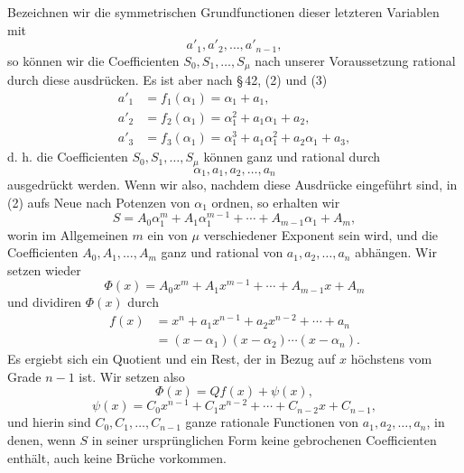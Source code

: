 \documentclass[11pt]{article}
\begin{document}
Bezeichnen wir die symmetrischen Grundfunctionen dieser letzteren Variablen mit
\[
 a'_1,a'_2,\ldots,a'_{n-1},
\]
so können wir die Coefficienten \(S_0,S_1,\ldots,S_\mu\) nach unserer Voraussetzung rational durch diese ausdrücken. Es ist aber nach \S\,42, (2) und (3)
\[
\begin{aligned}
 a'_1&=f_1(\alpha_1)=\alpha_1+a_1,\\
 a'_2&=f_2(\alpha_1)=\alpha_1^2+a_1\alpha_1+a_2,\\
 a'_3&=f_3(\alpha_1)=\alpha_1^3+a_1\alpha_1^2+a_2\alpha_1+a_3,
\end{aligned}
\]
d. h. die Coefficienten \(S_0,S_1,\ldots,S_\mu\) können ganz und rational durch
\[
 \alpha_1,a_1,a_2,\ldots,a_n
\]
ausgedrückt werden. Wenn wir also, nachdem diese Ausdrücke eingeführt sind, in (2) aufs Neue nach Potenzen von \(\alpha_1\) ordnen, so erhalten wir
\begin{equation}
 S=A_0\alpha_1^m+A_1\alpha_1^{m-1}+\cdots+A_{m-1}\alpha_1+A_m,
\tag{3}
\end{equation}
worin im Allgemeinen \(m\) ein von \(\mu\) verschiedener Exponent sein wird, und die Coefficienten \(A_0,A_1,\ldots,A_m\) ganz und rational von \(a_1,a_2,\ldots,a_n\) abhängen. Wir setzen wieder
\begin{equation}
 \Phi(x)=A_0x^m+A_1x^{m-1}+\cdots+A_{m-1}x+A_m
\tag{4}
\end{equation}
und dividiren \(\Phi(x)\) durch
\[
\begin{aligned}
 f(x)&=x^n+a_1x^{n-1}+a_2x^{n-2}+\cdots+a_n\\
     &=(x-\alpha_1)(x-\alpha_2)\cdots(x-\alpha_n).
\end{aligned}
\]
Es ergiebt sich ein Quotient und ein Rest, der in Bezug auf \(x\) höchstens vom Grade \(n-1\) ist. Wir setzen also
\begin{equation}
 \Phi(x)=Qf(x)+\psi(x),
\tag{5}
\end{equation}
\begin{equation}
 \psi(x)=C_0x^{n-1}+C_1x^{n-2}+\cdots+C_{n-2}x+C_{n-1},
\tag{6}
\end{equation}
und hierin sind \(C_0,C_1,\ldots,C_{n-1}\) ganze rationale Functionen von \(a_1,a_2,\ldots,a_n\), in denen, wenn \(S\) in seiner ursprünglichen Form keine gebrochenen Coefficienten enthält, auch keine Brüche vorkommen.
\end{document}
